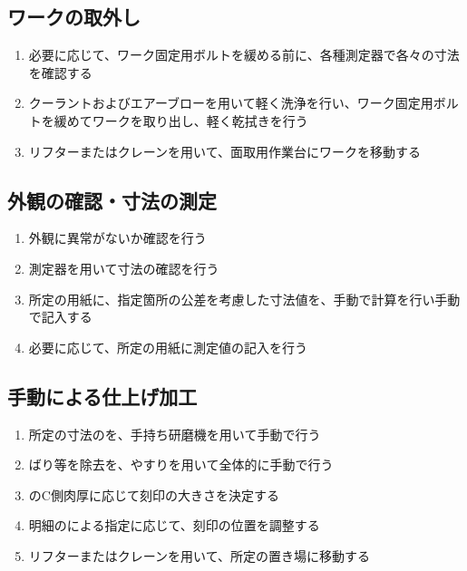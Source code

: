 \subsection{ワークの取外し}
\begin{enumerate}[label=\sarrow]
\item 必要に応じて、ワーク固定用ボルトを緩める前に、各種測定器で各々の寸法を確認する
\item {}クーラントおよびエアーブローを用いて軽く洗浄を行い、ワーク固定用ボルトを緩めてワークを取り出し、軽く乾拭きを行う
\item {}リフターまたはクレーンを用いて、面取用作業台にワークを移動する
\end{enumerate}


\subsection{外観の確認・寸法の測定}
\begin{enumerate}[label=\sarrow]
\item {}外観に異常がないか確認を行う
\item {}測定器を用いて寸法の確認を行う
\item 所定の用紙に、指定箇所の公差を考慮した寸法値を、手動で計算を行い手動で記入する
\item 必要に応じて、所定の用紙に測定値の記入を行う
\end{enumerate}


\subsection{手動による仕上げ加工}
\begin{enumerate}[label=\sarrow]
\item 所定の寸法の\EndFaceChamfer を、手持ち研磨機を用いて手動で行う
\item {}ばり等を除去を、やすりを用いて全体的に手動で行う
\item {}\nameBottomEndFace のC側肉厚に応じて刻印の大きさを決定する
\item 明細のによる指定に応じて、刻印の位置を調整する
\item リフターまたはクレーンを用いて、所定の置き場に移動する
\end{enumerate}

